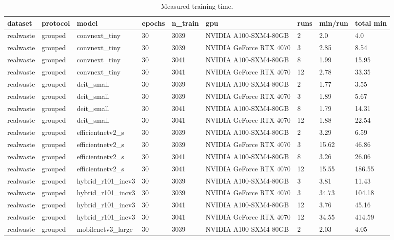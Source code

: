 \begin{table}[ht]
\centering
\small
\caption{Measured training time.}
\label{tab:tab_s1_runtime}
\begin{tabular}{lllllllll}
\hline
dataset & protocol & model & epochs & n\_train & gpu & runs & min/run & total min \\
\hline
realwaste & grouped & convnext\_tiny & 30 & 3039 & NVIDIA A100-SXM4-80GB & 2 & 2.0 & 4.0 \\
realwaste & grouped & convnext\_tiny & 30 & 3039 & NVIDIA GeForce RTX 4070 & 3 & 2.85 & 8.54 \\
realwaste & grouped & convnext\_tiny & 30 & 3041 & NVIDIA A100-SXM4-80GB & 8 & 1.99 & 15.95 \\
realwaste & grouped & convnext\_tiny & 30 & 3041 & NVIDIA GeForce RTX 4070 & 12 & 2.78 & 33.35 \\
realwaste & grouped & deit\_small & 30 & 3039 & NVIDIA A100-SXM4-80GB & 2 & 1.77 & 3.55 \\
realwaste & grouped & deit\_small & 30 & 3039 & NVIDIA GeForce RTX 4070 & 3 & 1.89 & 5.67 \\
realwaste & grouped & deit\_small & 30 & 3041 & NVIDIA A100-SXM4-80GB & 8 & 1.79 & 14.31 \\
realwaste & grouped & deit\_small & 30 & 3041 & NVIDIA GeForce RTX 4070 & 12 & 1.88 & 22.54 \\
realwaste & grouped & efficientnetv2\_s & 30 & 3039 & NVIDIA A100-SXM4-80GB & 2 & 3.29 & 6.59 \\
realwaste & grouped & efficientnetv2\_s & 30 & 3039 & NVIDIA GeForce RTX 4070 & 3 & 15.62 & 46.86 \\
realwaste & grouped & efficientnetv2\_s & 30 & 3041 & NVIDIA A100-SXM4-80GB & 8 & 3.26 & 26.06 \\
realwaste & grouped & efficientnetv2\_s & 30 & 3041 & NVIDIA GeForce RTX 4070 & 12 & 15.55 & 186.55 \\
realwaste & grouped & hybrid\_r101\_incv3 & 30 & 3039 & NVIDIA A100-SXM4-80GB & 3 & 3.81 & 11.43 \\
realwaste & grouped & hybrid\_r101\_incv3 & 30 & 3039 & NVIDIA GeForce RTX 4070 & 3 & 34.73 & 104.18 \\
realwaste & grouped & hybrid\_r101\_incv3 & 30 & 3041 & NVIDIA A100-SXM4-80GB & 12 & 3.76 & 45.16 \\
realwaste & grouped & hybrid\_r101\_incv3 & 30 & 3041 & NVIDIA GeForce RTX 4070 & 12 & 34.55 & 414.59 \\
realwaste & grouped & mobilenetv3\_large & 30 & 3039 & NVIDIA A100-SXM4-80GB & 2 & 2.03 & 4.05 \\

\end{tabular}
\end{table}

